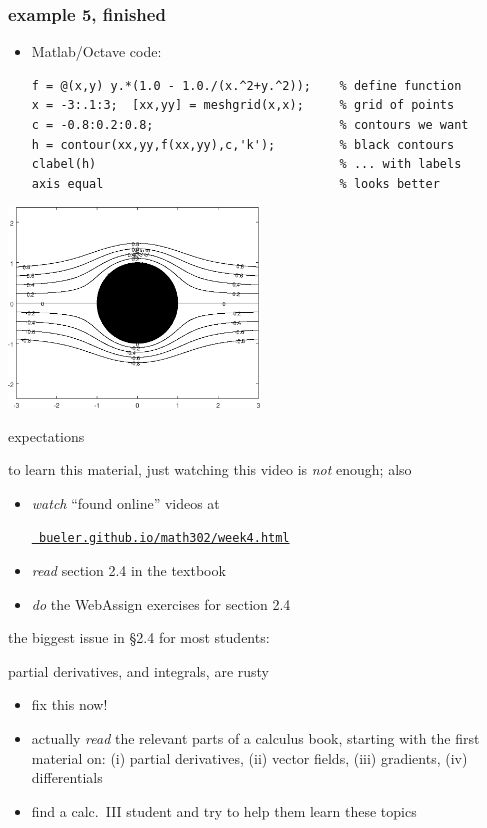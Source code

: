 \documentclass{beamer}
\begin{document}
\begin{frame}[fragile]
\frametitle{example 5, finished}

\begin{itemize}
\item Matlab/Octave code:
\begin{Verbatim}[fontsize=\footnotesize]
f = @(x,y) y.*(1.0 - 1.0./(x.^2+y.^2));    % define function
x = -3:.1:3;  [xx,yy] = meshgrid(x,x);     % grid of points
c = -0.8:0.2:0.8;                          % contours we want
h = contour(xx,yy,f(xx,yy),c,'k');         % black contours
clabel(h)                                  % ... with labels
axis equal                                 % looks better
\end{Verbatim}
\end{itemize}

\begin{center}
\includegraphics[width=0.5\textwidth]{figs/streamcyl-labeled}
\end{center}
\end{frame}


\begin{frame}{expectations}

to learn this material, just watching this video is \emph{not} enough; also
\begin{itemize}
\item \emph{watch} ``found online'' videos at

\centerline{\href{https://bueler.github.io/math302/week4.html}{\tt \color{cyan} bueler.github.io/math302/week4.html}}
\item \emph{read} section 2.4 in the textbook
\item \emph{do} the WebAssign exercises for section 2.4
\end{itemize}

\bigskip
\alert{the biggest issue in \S 2.4 for most students:}

\centerline{partial derivatives, and integrals, are rusty}

\begin{itemize}
\item fix this now!
\item actually \emph{read} the relevant parts of a calculus book, starting with the first material on: (i) partial derivatives, (ii) vector fields, (iii) gradients, (iv) differentials
\item find a calc.~III student and try to help them learn these topics
\end{itemize}
\end{frame}
\end{document}
